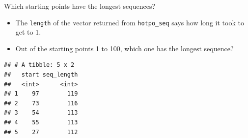 \documentclass[
  ignorenonframetext,
]{beamer}
\newenvironment{Shaded}{\begin{snugshade}}{\end{snugshade}}
\newcommand{\DataTypeTok}[1]{\textcolor[rgb]{0.13,0.29,0.53}{#1}}
\newcommand{\DecValTok}[1]{\textcolor[rgb]{0.00,0.00,0.81}{#1}}
\newcommand{\KeywordTok}[1]{\textcolor[rgb]{0.13,0.29,0.53}{\textbf{#1}}}
\newcommand{\NormalTok}[1]{#1}
\newcommand{\OperatorTok}[1]{\textcolor[rgb]{0.81,0.36,0.00}{\textbf{#1}}}
\newcommand{\StringTok}[1]{\textcolor[rgb]{0.31,0.60,0.02}{#1}}
\providecommand{\tightlist}{%
  \setlength{\itemsep}{0pt}\setlength{\parskip}{0pt}}
\begin{document}
\begin{frame}[fragile]{Which starting points have the longest
sequences?}
\protect\hypertarget{which-starting-points-have-the-longest-sequences}{}

\begin{itemize}
\tightlist
\item
  The \texttt{length} of the vector returned from \texttt{hotpo\_seq}
  says how long it took to get to 1.
\item
  Out of the starting points 1 to 100, which one has the longest
  sequence?
\end{itemize}

\small

\begin{Shaded}
\end{Shaded}

\begin{verbatim}
## # A tibble: 5 x 2
##   start seq_length
##   <int>      <int>
## 1    97        119
## 2    73        116
## 3    54        113
## 4    55        113
## 5    27        112
\end{verbatim}

\normalsize

\end{frame}
\end{document}
